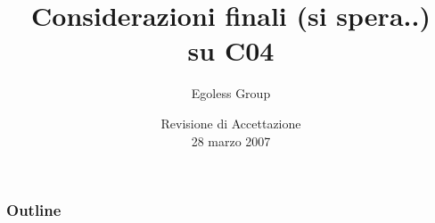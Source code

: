 



\title{Considerazioni finali (si spera..) \\ su C04}

\author{Egoless Group}

\date[RA 28/03/2007] %
{Revisione di Accettazione \\ 28 marzo 2007}

\subject{Presentazione del prodotto per il capitolato C04}








\begin{frame}
  \titlepage
\end{frame}

\begin{frame}
  \frametitle{Outline}
  \tableofcontents
\end{frame}




